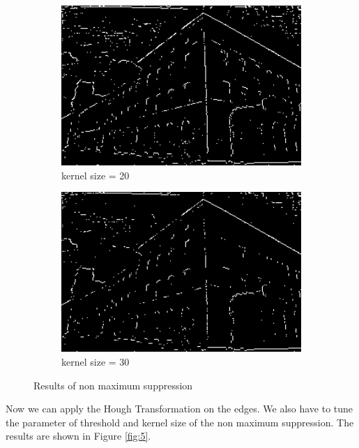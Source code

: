 \documentclass[12pt
,headinclude
,headsepline
,bibtotocnumbered
]{scrartcl}
\begin{document}
\begin{figure}[H]
    \\
    \begin{subfigure}{0.45\textwidth}
        \includegraphics[width=1\textwidth]{plots/edges_20.png}
        \caption*{kernel size = 20}
    \end{subfigure}
    \hfill
    \begin{subfigure}{0.45\textwidth}
        \includegraphics[width=1\textwidth]{plots/edges_30.png}
        \caption*{kernel size = 30}
    \end{subfigure}
    \caption{Results of non maximum suppression}
    \label{fig:4}
\end{figure}
Now we can apply the Hough Transformation on the edges. We also have to tune the parameter of threshold and kernel size of the non maximum suppression. The results are shown in Figure \ref{fig:5}.
\end{document}
